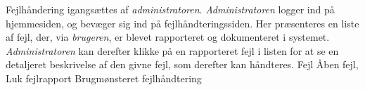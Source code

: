 {Fejlhåndering igangsættes af \textit{administratoren}. \textit{Administratoren} logger ind på hjemmesiden, og bevæger sig ind på fejlhåndteringssiden. Her præsenteres en liste af  fejl, der, via \textit{brugeren}, er blevet rapporteret og dokumenteret i systemet. \textit{Administratoren} kan derefter klikke på en rapporteret fejl i listen for at se en detaljeret beskrivelse af den givne fejl, som derefter kan håndteres.}
{Fejl}
{Åben fejl, Luk fejlrapport}
{Brugmønsteret fejlhåndtering}
